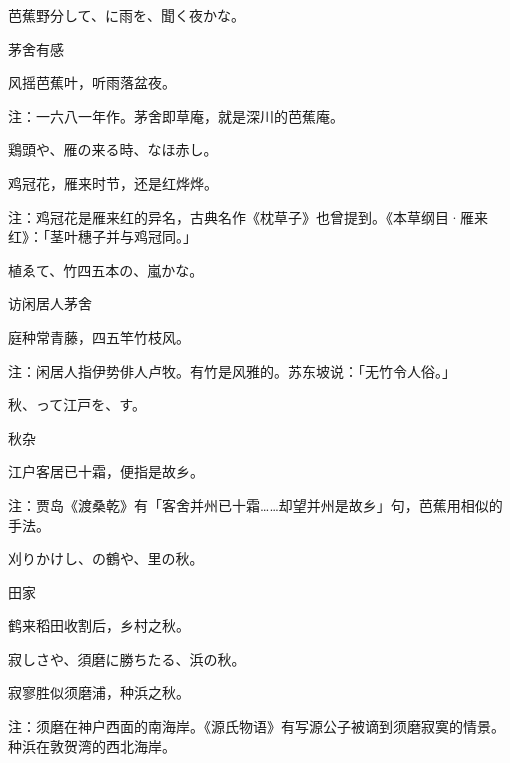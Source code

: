 \begin{haiku}
    {\FH 芭蕉野分して、に雨を、聞く夜かな。}

    {\FK 茅舍有感}

    {\FK 风摇芭蕉叶，听雨落盆夜。}

    {\FT 注：一六八一年作。茅舍即草庵，就是深川的芭蕉庵。}
\end{haiku}

\begin{haiku}
    {\FH 鶏頭や、雁の来る時、なほ赤し。}

    {\FK 鸡冠花，雁来时节，还是红烨烨。}

    {\FT 注：鸡冠花是雁来红的异名，古典名作《枕草子》也曾提到。《本草纲目·雁来红》：「茎叶穗子并与鸡冠同。」}
\end{haiku}

\begin{haiku}
    {\FH {}植ゑて、竹四五本の、嵐かな。}

    {\FK 访闲居人茅舍}

    {\FK 庭种常青藤，四五竿竹枝风。}

    {\FT 注：闲居人指伊势俳人卢牧。有竹是风雅的。苏东坡说：「无竹令人俗。」}
\end{haiku}

\begin{haiku}
    {\FH 秋、って江戸を、す。}

    {\FK 秋杂}

    {\FK 江户客居已十霜，便指是故乡。}

    {\FT 注：贾岛《渡桑乾》有「客舍并州已十霜……却望并州是故乡」句，芭蕉用相似的手法。}
\end{haiku}

\begin{haiku}
    {\FH 刈りかけし、の鶴や、里の秋。}

    {\FK 田家}

    {\FK 鹤来稻田收割后，乡村之秋。}
\end{haiku}

\begin{haiku}
    {\FH 寂しさや、須磨に勝ちたる、浜の秋。}

    {\FK 寂寥胜似须磨浦，种浜之秋。}

    {\FT 注：须磨在神户西面的南海岸。《源氏物语》有写源公子被谪到须磨寂寞的情景。种浜在敦贺湾的西北海岸。}
\end{haiku}

